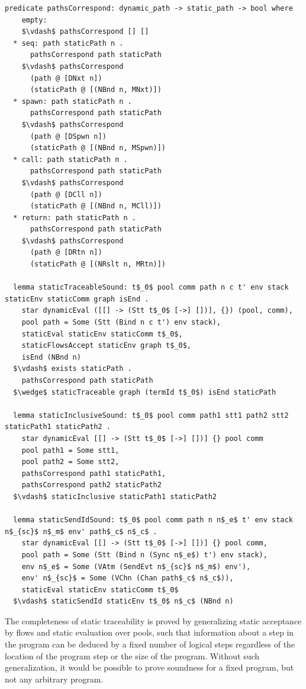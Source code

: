 \documentclass[letterpaper, 11pt]{extarticle}
\begin{document}
\begin{lstlisting}[language=logic, mathescape]
  predicate pathsCorrespond: dynamic_path -> static_path -> bool where
    empty:
    $\vdash$ pathsCorrespond [] []
  * seq: path staticPath n .
      pathsCorrespond path staticPath
    $\vdash$ pathsCorrespond
      (path @ [DNxt n])
      (staticPath @ [(NBnd n, MNxt)])
  * spawn: path staticPath n .
      pathsCorrespond path staticPath
    $\vdash$ pathsCorrespond
      (path @ [DSpwn n])
      (staticPath @ [(NBnd n, MSpwn)])
  * call: path staticPath n .
      pathsCorrespond path staticPath
    $\vdash$ pathsCorrespond
      (path @ [DCll n])
      (staticPath @ [(NBnd n, MCll)])
  * return: path staticPath n .
      pathsCorrespond path staticPath
    $\vdash$ pathsCorrespond
      (path @ [DRtn n])
      (staticPath @ [(NRslt n, MRtn)])

  lemma staticTraceableSound: t$_0$ pool comm path n c t' env stack staticEnv staticComm graph isEnd .
    star dynamicEval ([[] -> (Stt t$_0$ [->] [])], {}) (pool, comm), 
    pool path = Some (Stt (Bind n c t') env stack),
    staticEval staticEnv staticComm t$_0$,
    staticFlowsAccept staticEnv graph t$_0$,
    isEnd (NBnd n)
  $\vdash$ exists staticPath . 
    pathsCorrespond path staticPath
  $\wedge$ staticTraceable graph (termId t$_0$) isEnd staticPath

  lemma staticInclusiveSound: t$_0$ pool comm path1 stt1 path2 stt2 staticPath1 staticPath2 . 
    star dynamicEval [[] -> (Stt t$_0$ [->] [])] {} pool comm
    pool path1 = Some stt1, 
    pool path2 = Some stt2, 
    pathsCorrespond path1 staticPath1, 
    pathsCorrespond path2 staticPath2
  $\vdash$ staticInclusive staticPath1 staticPath2

  lemma staticSendIdSound: t$_0$ pool comm path n n$_e$ t' env stack n$_{sc}$ n$_m$ env' path$_c$ n$_c$ .
    star dynamicEval [[] -> (Stt t$_0$ [->] [])] {} pool comm, 
    pool path = Some (Stt (Bind n (Sync n$_e$) t') env stack), 
    env n$_e$ = Some (VAtm (SendEvt n$_{sc}$ n$_m$) env'), 
    env' n$_{sc}$ = Some (VChn (Chan path$_c$ n$_c$)), 
    staticEval staticEnv staticComm t$_0$
  $\vdash$ staticSendId staticEnv t$_0$ n$_c$ (NBnd n)
\end{lstlisting}

The completeness of static traceability is proved by generalizing
static acceptance by flows and static evaluation over pools, such that information about a step in
the program can be deduced by a fixed number of logical steps regardless of the location of the
program step or the size of the program. Without such generalization, it would be possible to
prove soundness for a fixed program, but not any arbitrary program.
\end{document}
